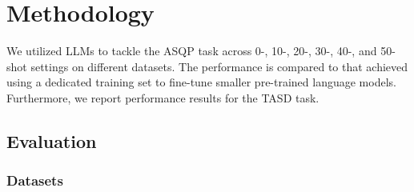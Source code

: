 \section{Methodology}

We utilized LLMs to tackle the ASQP task across 0-, 10-, 20-, 30-, 40-, and 50-shot settings on different datasets. The performance is compared to that achieved using a dedicated training set to fine-tune smaller pre-trained language models. Furthermore, we report performance results for the TASD task.

\subsection{Evaluation}

\subsubsection{Datasets}

\begin{table*}[h]
\centering
{}
\caption{Overview of all ASQP datasets considered for evaluation. The datasets cover a range of different numbers of considered aspect categories and domains. }
\label{tab:overview-datasets}
\end{table*}

